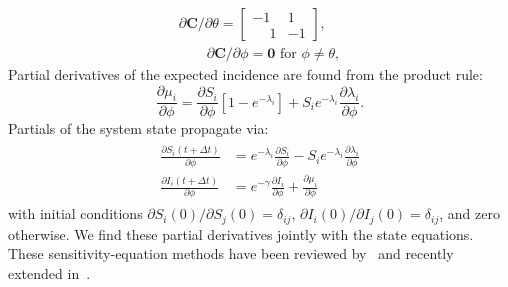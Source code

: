 \begin{align*}
\partial \mathbf{C}/\partial \theta =
\begin{bmatrix}
  -1 &  1 \\
  \phantom{-}1 & -1
\end{bmatrix},\\
\qquad
\partial \mathbf{C}/\partial \phi = \mathbf{0} \text{ for } \phi \neq \theta,
\end{align*}
Partial derivatives of the expected incidence are found from the
product rule:
\begin{equation}\label{eq:sens_mu}
  \frac{\partial \mu_i}{\partial \phi} =
  \frac{\partial S_i}{\partial \phi} [1 - e^{-\lambda_i}] + S_i
  e^{-\lambda_i} \frac{\partial \lambda_i}{\partial \phi}.
\end{equation}
Partials of the system state propagate via:
\begin{align}\begin{split}\label{eq:sens}
\frac{\partial S_i(t+\Delta t)}{\partial \phi} &= e^{-\lambda_i}
\frac{\partial S_i}{\partial \phi} - S_i e^{-\lambda_i}
\frac{\partial \lambda_i}{\partial \phi} \\
\frac{\partial I_i(t+\Delta t)}{\partial \phi} &= e^{-\gamma}
\frac{\partial I_i}{\partial \phi} +
\frac{\partial \mu_i}{\partial \phi}
\end{split}\end{align}
with initial conditions $\partial S_i(0)/\partial S_j(0) =
\delta_{ij}$, $\partial I_i(0)/\partial I_j(0) = \delta_{ij}$, and
zero otherwise. We find these partial derivatives jointly with the
state equations. These sensitivity-equation methods have been reviewed
by~\citet{wu2013sensitivity} and recently extended
in~\citet{mester2022}.

